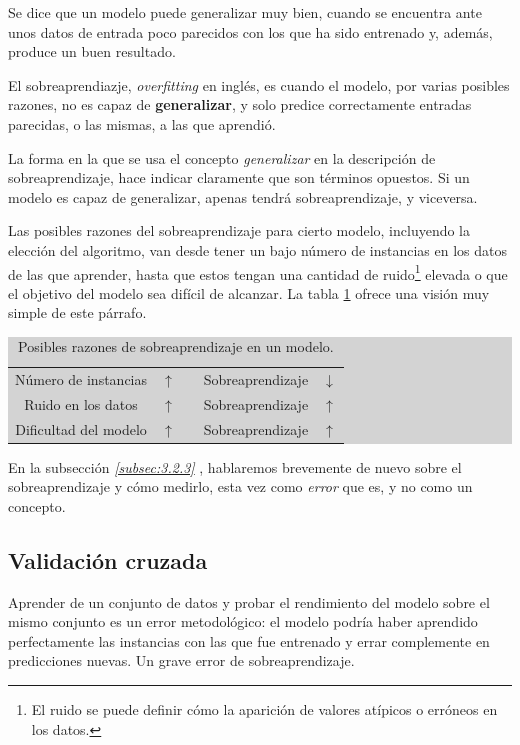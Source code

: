 Se dice que un modelo puede generalizar muy bien, cuando se encuentra ante unos datos de entrada poco parecidos con los que ha sido entrenado y, además, produce un buen resultado.

El sobreaprendiazje, \emph{overfitting} en inglés, es cuando el modelo, por varias posibles razones, no es capaz de \textbf{generalizar}, y solo predice correctamente entradas parecidas, o las mismas, a las que aprendió.

La forma en la que se usa el concepto \emph{generalizar} en la descripción de sobreaprendizaje, hace indicar claramente que son términos opuestos. Si un modelo es capaz de generalizar, apenas tendrá sobreaprendizaje, y viceversa.

Las posibles razones del sobreaprendizaje para cierto modelo, incluyendo la elección del algoritmo, van desde tener un bajo número de instancias en los datos de las que aprender, hasta que estos tengan una cantidad de ruido\footnote{El ruido se puede definir cómo la aparición de valores atípicos o erróneos en los datos.} elevada o que el objetivo del modelo sea difícil de alcanzar. La tabla \ref{table:3.1} ofrece una visión muy simple de este párrafo.

\begin{table}[H]
\centering
\colorbox{lightgray}{\begin{tabular}{*{5}{c}}
  Número de instancias & $\uparrow$ & \; & Sobreaprendizaje & $\downarrow$ \\
  Ruido en los datos & $\uparrow$ & \; & Sobreaprendizaje & $\uparrow$ \\
  Dificultad del modelo & $\uparrow$ & \; & Sobreaprendizaje & $\uparrow$
\end{tabular}}
\caption{Posibles razones de sobreaprendizaje en un modelo.}
\label{table:3.1}
\end{table}

En la subsección \emph{\ref{subsec:3.2.3} }, hablaremos brevemente de nuevo sobre el sobreaprendizaje y cómo medirlo, esta vez como \emph{error} que es, y no como un concepto.

\subsection{Validación cruzada} \label{subsec:3.2.2}

Aprender de un conjunto de datos y probar el rendimiento del modelo sobre el mismo conjunto es un error metodológico: el modelo podría haber aprendido perfectamente las instancias con las que fue entrenado y errar complemente en predicciones nuevas. Un grave error de sobreaprendizaje.

